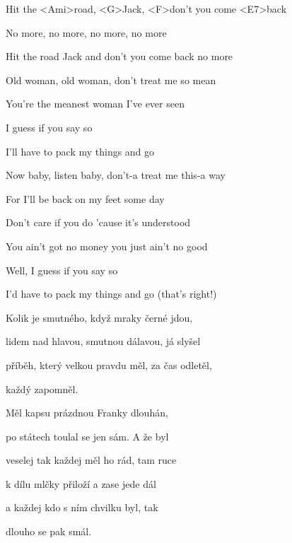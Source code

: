 
\zr
Hit the <Ami>road, <G>Jack, <F>don't you come <E7>back

No more, no more, no more, no more

Hit the road Jack and don't you come back no more

\kr
\zs

Old woman, old woman, don't treat me so mean

You're the meanest woman I've ever seen

I guess if you say so

I'll have to pack my things and go

\ks

\zr
\kr

\zs

Now baby, listen baby, don't-a treat me this-a way

For I'll be back on my feet some day

Don't care if you do 'cause it's understood

You ain't got no money you just ain't no good


Well, I guess if you say so

I'd have to pack my things and go (that's right!)

\ks

\zr
\kr

\zs
Kolik je smutného, když mraky černé jdou,

lidem nad hlavou, smutnou dálavou, já slyšel

příběh, který velkou pravdu měl, za čas odletěl,

každý zapomněl.
\ks

\zr
\kr

\zs
Měl kapsu prázdnou Franky dlouhán,

po státech toulal se jen sám. A že byl 

veselej tak každej měl ho rád, tam ruce

k dílu mlčky přiloží a zase jede dál

a každej kdo s ním chvilku byl, tak

dlouho se pak smál.
\ks

\zr
\kr

\kp
